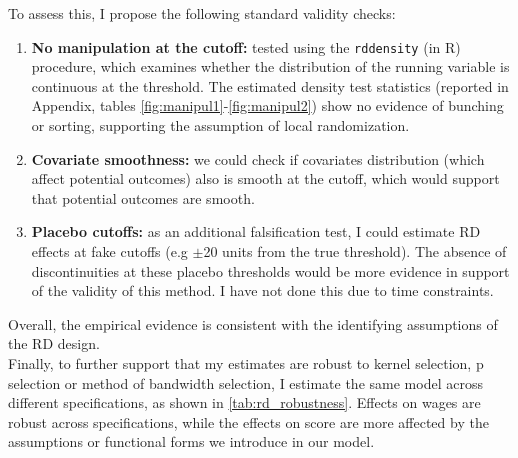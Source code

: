\documentclass{article}
\begin{document}
To assess this, I propose the following standard validity checks:

\begin{enumerate}
    \item \textbf{No manipulation at the cutoff:} tested using the \texttt{rddensity} (in R) procedure, which examines whether the distribution of the running variable is continuous at the threshold. The estimated density test statistics (reported in Appendix, tables \ref{fig:manipul1}-\ref{fig:manipul2}) show no evidence of bunching or sorting, supporting the assumption of local randomization.
    
    \item \textbf{Covariate smoothness:} we could check if covariates distribution (which affect potential outcomes) also is smooth at the cutoff, which would support that potential outcomes are smooth.

    
    \item \textbf{Placebo cutoffs:} as an additional falsification test, I could estimate RD effects at fake cutoffs (e.g $\pm$20 units from the true threshold). The absence of discontinuities at these placebo thresholds would be more evidence in support of the validity of this method. I have not done this due to time constraints.
\end{enumerate}

Overall, the empirical evidence is consistent with the identifying assumptions of the RD design. \\

Finally, to further support that my estimates are robust to kernel selection, p selection or method of bandwidth selection, I estimate the same model across different specifications, as shown in \ref{tab:rd_robustness}. Effects on wages are robust across specifications, while the effects on score are more affected by the assumptions or functional forms we introduce in our model. 
\end{document}
